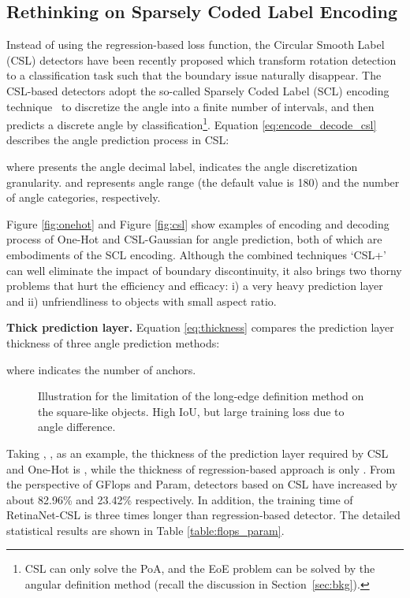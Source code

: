 \documentclass[final]{cvpr}
\begin{document}
\subsection{Rethinking on Sparsely Coded Label Encoding}\label{sec:scl}
Instead of using the regression-based loss function, the Circular Smooth Label (CSL) \cite{yang2020arbitrary} detectors have been recently proposed which transform rotation detection to a classification task such that the boundary issue naturally disappear. The CSL-based detectors adopt the so-called Sparsely Coded Label (SCL) encoding technique~\cite{yang2020arbitrary} to discretize the angle into a finite number of intervals, and then predicts a discrete angle by classification\footnote{CSL can only solve the PoA, and the EoE problem can be solved by the  angular definition method (recall the discussion in Section~\ref{sec:bkg}).}. Equation \ref{eq:encode_decode_csl} describes the angle prediction process in CSL:

where  presents the angle decimal label,  indicates the angle discretization granularity.  and  represents angle range (the default value is 180) and the number of angle categories, respectively.  

Figure \ref{fig:onehot} and Figure \ref{fig:csl} show examples of encoding and decoding process of One-Hot and CSL-Gaussian for angle prediction, both of which are embodiments of the SCL encoding. Although the combined techniques `CSL+' can well eliminate the impact of boundary discontinuity, it also brings two thorny problems that hurt the efficiency and efficacy: i) {a very heavy prediction layer} and ii) {unfriendliness to objects with small aspect ratio}.

\textbf{Thick prediction layer.} 
Equation \ref{eq:thickness} compares the prediction layer thickness of three angle prediction methods:

where  indicates the number of anchors.

\begin{figure}[!tb]
		\centering
		\centering
		\caption{Illustration for the limitation of the long-edge definition method on the square-like objects. High IoU, but large training loss due to angle difference.}
		\label{fig:180_BD}
\end{figure}
Taking , ,  as an example, the thickness of the prediction layer required by CSL and One-Hot is , while the thickness of regression-based approach is only . From the perspective of GFlops and Param, detectors based on CSL have increased by about 82.96\% and 23.42\% respectively. In addition, the training time of RetinaNet-CSL is three times longer than regression-based detector. The detailed statistical results are shown in Table \ref{table:flops_param}. 
\end{document}
